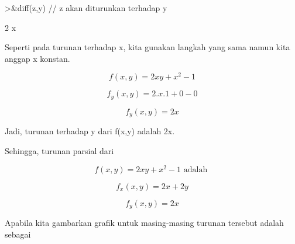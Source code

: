 \documentclass[a4paper,10pt]{article}
\begin{document}
\begin{eulernotebook}
\begin{eulercomment}
\begin{eulercomment}
\begin{eulercomment}
\begin{eulercomment}
\begin{eulercomment}
\begin{eulercomment}
\begin{eulercomment}
\begin{eulercomment}
\begin{eulercomment}
\begin{eulercomment}
\begin{eulercomment}
\begin{eulercomment}
\begin{eulercomment}
\begin{eulercomment}
\begin{eulercomment}
\begin{eulercomment}
\begin{eulercomment}
\begin{eulercomment}
\begin{eulercomment}
\begin{eulercomment}
\begin{eulercomment}
\begin{eulercomment}
\begin{eulercomment}
\begin{eulercomment}
\begin{eulercomment}
\begin{eulercomment}
\begin{eulercomment}
\begin{eulercomment}
\begin{eulercomment}
\begin{eulercomment}
\begin{eulercomment}
\begin{eulercomment}
\begin{eulercomment}
\begin{eulercomment}
\begin{eulercomment}
\begin{eulercomment}
\begin{eulercomment}
\begin{eulercomment}
\begin{eulercomment}
\begin{eulercomment}
\begin{eulercomment}
\begin{eulercomment}
\begin{eulercomment}
\begin{eulercomment}
\begin{eulercomment}
\begin{eulercomment}
\begin{eulercomment}
\begin{eulercomment}
\begin{eulercomment}
\begin{eulercomment}
\begin{eulercomment}
\begin{eulercomment}
\begin{eulercomment}
\begin{eulercomment}
\begin{eulercomment}
\begin{eulercomment}
\begin{eulercomment}
\begin{eulercomment}
\begin{eulercomment}
\begin{eulercomment}
\begin{eulercomment}
\end{eulercomment}
\begin{eulerprompt}
>&diff(z,y) // z akan diturunkan terhadap y
\end{eulerprompt}
\begin{euleroutput}
  
                                   2 x
  
\end{euleroutput}
\begin{eulercomment}
Seperti pada turunan terhadap x, kita gunakan langkah yang sama namun
kita anggap x konstan.

\end{eulercomment}
\begin{eulerformula}
\[
f(x,y)=2xy+x^2-1
\]
\end{eulerformula}
\begin{eulerformula}
\[
f_y(x,y)=2.x.1+0-0
\]
\end{eulerformula}
\begin{eulerformula}
\[
f_y(x,y)=2x
\]
\end{eulerformula}
\begin{eulercomment}
Jadi, turunan terhadap y dari f(x,y) adalah 2x.


Sehingga, turunan parsial dari\\
\end{eulercomment}
\begin{eulerformula}
\[
f(x,y)=2xy+x^2-1 \text{ adalah }
\]
\end{eulerformula}
\begin{eulerformula}
\[
f_x(x,y)=2x+2y
\]
\end{eulerformula}
\begin{eulerformula}
\[
f_y(x,y)=2x
\]
\end{eulerformula}
\begin{eulercomment}
Apabila kita gambarkan grafik untuk masing-masing turunan tersebut
adalah sebagai 
\end{eulercomment}
\end{eulercomment}
\end{eulercomment}
\end{eulercomment}
\end{eulercomment}
\end{eulercomment}
\end{eulercomment}
\end{eulercomment}
\end{eulercomment}
\end{eulercomment}
\end{eulercomment}
\end{eulercomment}
\end{eulercomment}
\end{eulercomment}
\end{eulercomment}
\end{eulercomment}
\end{eulercomment}
\end{eulercomment}
\end{eulercomment}
\end{eulercomment}
\end{eulercomment}
\end{eulercomment}
\end{eulercomment}
\end{eulercomment}
\end{eulercomment}
\end{eulercomment}
\end{eulercomment}
\end{eulercomment}
\end{eulercomment}
\end{eulercomment}
\end{eulercomment}
\end{eulercomment}
\end{eulercomment}
\end{eulercomment}
\end{eulercomment}
\end{eulercomment}
\end{eulercomment}
\end{eulercomment}
\end{eulercomment}
\end{eulercomment}
\end{eulercomment}
\end{eulercomment}
\end{eulercomment}
\end{eulercomment}
\end{eulercomment}
\end{eulercomment}
\end{eulercomment}
\end{eulercomment}
\end{eulercomment}
\end{eulercomment}
\end{eulercomment}
\end{eulercomment}
\end{eulercomment}
\end{eulercomment}
\end{eulercomment}
\end{eulercomment}
\end{eulercomment}
\end{eulercomment}
\end{eulercomment}
\end{eulercomment}
\end{eulercomment}
\end{eulernotebook}
\end{document}
